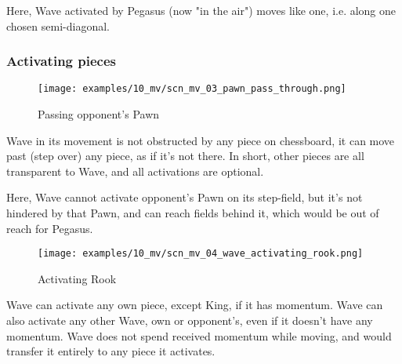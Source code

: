 Here, Wave activated by Pegasus (now "in the air") moves like one, i.e. along one
chosen semi-diagonal.

\clearpage %

\subsubsection*{Activating pieces}
\label{sec:Miranda's veil/Wave/Activation/Activating pieces}

\vspace*{-1.5\baselineskip}
\noindent
\begin{figure}[!h]
\texttt{[image: examples/10\_mv/scn\_mv\_03\_pawn\_pass\_through.png]}
\vspace*{-1.4\baselineskip}
\caption{Passing opponent's Pawn}
\label{fig:scn_mv_03_pawn_pass_through}
\end{figure}

\vspace*{-0.5\baselineskip}
Wave in its movement is not obstructed by any piece on chessboard, it can move
past (step over) any piece, as if it's not there. In short, other pieces are
all transparent to Wave, and all activations are optional.

Here, Wave cannot activate opponent's Pawn on its step-field, but it's not
hindered by that Pawn, and can reach fields behind it, which would be out of
reach for Pegasus.

\clearpage %

\vspace*{-2.1\baselineskip}
\noindent
\begin{figure}[!h]
\texttt{[image: examples/10\_mv/scn\_mv\_04\_wave\_activating\_rook.png]}
\vspace*{-1.3\baselineskip}
\caption{Activating Rook}
\label{fig:scn_mv_04_wave_activating_rook}
\end{figure}

\vspace*{-0.3\baselineskip}
Wave can activate any own piece, except King, if it has momentum. Wave can also
activate any other Wave, own or opponent's, even if it doesn't have any momentum.
Wave does not spend received momentum while moving, and would transfer it entirely
to any piece it activates.

